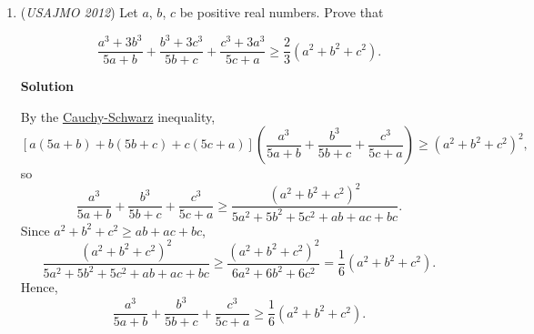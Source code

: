 \begin{enumerate}
 



\textbf{Solution 2}

\textbf{Outline:}

 1. Define the Fibonacci numbers to be $F_1 = F_2 = 1$ and $F_k = F_{k-1} + F_{k-2}$ for $k \ge 3$.

 2. If the chosen $n$ is such that $F_n \le n^2$, then choose the sequence $a_n$ such that $a_k = \sqrt{F_k}$ for $1 \le k \le n$. It is easy to verify that such a sequence satisfies the condition that the largest term is less than or equal to $n$ times the smallest term. Also, because for any three terms $x = \sqrt{F_a}, y = \sqrt{F_b}, z = \sqrt{F_c}$ with $a<b<c$, $x^2 + y^2 = F_a + F_b \le F_{b-1} + F_b = F_{b+1} \le F_c = z^2$, x, y, z do not form an acute triangle. Thus, all $n$ such that $F_n \le n^2$ do not work.

 3. It is easy to observe via a contradiction argument that all $n$ such that $F_n > n^2$ produce an acute triangle. (If, without loss of generality, $a_n$ is an increasing sequence, such that no three (in particular, consecutive) terms form an acute triangle, then $a_2^2 \ge F_1a_1^2, a_3^2 \ge a_2^2 + a_1^2 \ge F_2a^2$, and by induction $a_n^2 > F_na_1^2$, a contradiction to the condition's inequality.)

 4. Note that $F_{12} = 144 = 12^2$ and $F_{13} = 233 > 169 = 13^2$. It is easily to verify through strong induction that all $n$ greater than 12 make $F_n > n^2$. Thus, $\boxed{n \ge 13}$ is the desired solution set.

 


 


 


	\item (\textit{USAJMO 2012}) Let $a$, $b$, $c$ be positive real numbers.  Prove that

 \[\frac{a^3 + 3b^3}{5a + b} + \frac{b^3 + 3c^3}{5b + c} + \frac{c^3 + 3a^3}{5c + a} \ge \frac{2}{3} (a^2 + b^2 + c^2).\]




\textbf{Solution}

By the \href{https://artofproblemsolving.com/wiki/index.php?title=Cauchy-Schwarz\_Inequality}{Cauchy-Schwarz} inequality,
 \[[a(5a + b) + b(5b + c) + c(5c + a)] \left( \frac{a^3}{5a + b} + \frac{b^3}{5b + c} + \frac{c^3}{5c + a} \right) \ge (a^2 + b^2 + c^2)^2,\]so
 \[\frac{a^3}{5a + b} + \frac{b^3}{5b + c} + \frac{c^3}{5c + a} \ge \frac{(a^2 + b^2 + c^2)^2}{5a^2 + 5b^2 + 5c^2 + ab + ac + bc}.\]Since $a^2 + b^2 + c^2 \ge ab + ac + bc$,
 \[\frac{(a^2 + b^2 + c^2)^2}{5a^2 + 5b^2 + 5c^2 + ab + ac + bc} \ge \frac{(a^2 + b^2 + c^2)^2}{6a^2 + 6b^2 + 6c^2} = \frac{1}{6} (a^2 + b^2 + c^2).\]Hence,
 \[\frac{a^3}{5a + b} + \frac{b^3}{5b + c} + \frac{c^3}{5c + a} \ge \frac{1}{6} (a^2 + b^2 + c^2).\]


\end{enumerate}
